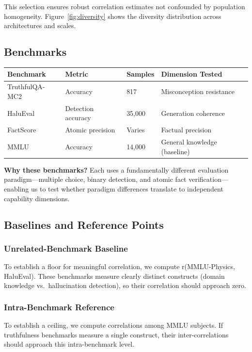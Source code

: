 This selection ensures robust correlation estimates not confounded by population homogeneity. Figure~\ref{fig:diversity} shows the diversity distribution across architectures and scales.

\subsection{Benchmarks}

\begin{table}[h]
\centering
\begin{tabular}{@{}llll@{}}
\toprule
\textbf{Benchmark} & \textbf{Metric} & \textbf{Samples} & \textbf{Dimension Tested} \\
\midrule
TruthfulQA-MC2 & Accuracy & 817 & Misconception resistance \\
HaluEval & Detection accuracy & 35,000 & Generation coherence \\
FactScore & Atomic precision & Varies & Factual precision \\
MMLU & Accuracy & 14,000 & General knowledge (baseline) \\
\bottomrule
\end{tabular}
\end{table}

\textbf{Why these benchmarks?} Each uses a fundamentally different evaluation paradigm---multiple choice, binary detection, and atomic fact verification---enabling us to test whether paradigm differences translate to independent capability dimensions.

\subsection{Baselines and Reference Points}

\subsubsection{Unrelated-Benchmark Baseline}
To establish a floor for meaningful correlation, we compute r(MMLU-Physics, HaluEval). These benchmarks measure clearly distinct constructs (domain knowledge vs.\ hallucination detection), so their correlation should approach zero.

\subsubsection{Intra-Benchmark Reference}
To establish a ceiling, we compute correlations among MMLU subjects. If truthfulness benchmarks measure a single construct, their inter-correlations should approach this intra-benchmark level.

